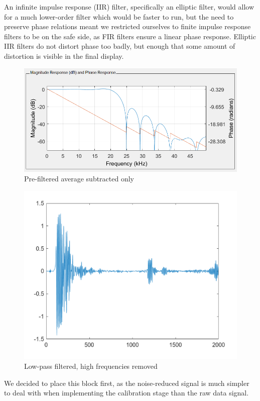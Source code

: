 An infinite impulse response (IIR) filter, specifically an elliptic filter, would allow for a much lower-order
 filter which would be faster to run, but the need to preserve phase relations meant we restricted ourselves to
 finite impulse response filters to be on the safe side, as FIR filters ensure a linear phase response. Elliptic
 IIR filters do not distort phase too badly, but enough that some amount of distortion is visible in the final
 display.

\begin{figure}[H]
    \centering
    \includegraphics[width=0.5\linewidth]{figures/tukey.PNG}
    \caption{Pre-filtered average subtracted only}
\end{figure}

\begin{figure}[H]
    \centering
    \includegraphics[width=0.5\linewidth]{figures/denoised.PNG}
    \caption{Low-pass filtered, high frequencies removed}
\end{figure}

We decided to place this block first, as the noise-reduced signal is much simpler to deal with when implementing
 the calibration stage than the raw data signal.